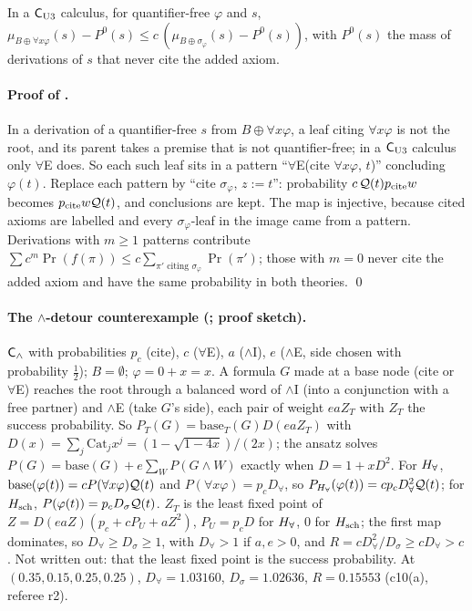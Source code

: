 \begin{proposition}\label{prop:univ:sim}
In a $\mathsf{C}_{\mathrm{U3}}$ calculus, for quantifier-free $\varphi$ and $s$, $\mu_{B\oplus\forall x\varphi}(s)-P^0(s)\le c\,(\mu_{B\oplus\sigma_\varphi}(s)-P^0(s))$, with $P^0(s)$ the mass of derivations of $s$ that never cite the added axiom.
\end{proposition}

\paragraph{Proof of .} In a derivation of a quantifier-free $s$ from $B\oplus\forall x\varphi$, a leaf citing $\forall x\varphi$ is not the root, and its parent takes a premise that is not quantifier-free; in a $\mathsf{C}_{\mathrm{U3}}$ calculus only $\forall$E does. So each such leaf sits in a pattern ``$\forall$E(cite $\forall x\varphi$, $t$)'' concluding $\varphi(t)$. Replace each pattern by ``cite $\sigma_\varphi$, $z:=t$'': probability $c\,\mathcal{Q}(t)p_{\mathrm{cite}}w$ becomes $p_{\mathrm{cite}}w\mathcal{Q}(t)$, and conclusions are kept. The map is injective, because cited axioms are labelled and every $\sigma_\varphi$-leaf in the image came from a pattern. Derivations with $m\ge1$ patterns contribute $\sum c^m\Pr(f(\pi))\le c\sum_{\pi'\text{ citing }\sigma_\varphi}\Pr(\pi')$; those with $m=0$ never cite the added axiom and have the same probability in both theories. \qed

\paragraph{The $\wedge$-detour counterexample (; proof sketch).}\label{app:univ:detour} $\mathsf{C}_{\wedge}$ with probabilities $p_c$ (cite), $c$ ($\forall$E), $a$ ($\wedge$I), $e$ ($\wedge$E, side chosen with probability $\tfrac12$); $B=\emptyset$; $\varphi=0+x=x$. A formula $G$ made at a base node (cite or $\forall$E) reaches the root through a balanced word of $\wedge$I (into a conjunction with a free partner) and $\wedge$E (take $G$'s side), each pair of weight $eaZ_T$ with $Z_T$ the success probability. So $P_T(G)=\mathrm{base}_T(G)D(eaZ_T)$ with $D(x)=\sum_j\mathrm{Cat}_jx^j=(1-\sqrt{1-4x})/(2x)$; the ansatz solves $P(G)=\mathrm{base}(G)+e\sum_WP(G\wedge W)$ exactly when $D=1+xD^2$. For $H_{\forall}$, $\mathrm{base}(\varphi(t))=cP(\forall x\varphi)\mathcal{Q}(t)$ and $P(\forall x\varphi)=p_cD_\forall$, so $P_{H_{\forall}}(\varphi(t))=cp_cD_\forall^2\mathcal{Q}(t)$; for $H_{\mathrm{sch}}$, $P(\varphi(t))=p_cD_\sigma\mathcal{Q}(t)$. $Z_T$ is the least fixed point of $Z=D(eaZ)(p_c+cP_U+aZ^2)$, $P_U=p_cD$ for $H_{\forall}$, $0$ for $H_{\mathrm{sch}}$; the first map dominates, so $D_\forall\ge D_\sigma\ge1$, with $D_\forall>1$ if $a,e>0$, and $R=cD_\forall^2/D_\sigma\ge cD_\forall>c$. Not written out: that the least fixed point is the success probability. At $(0.35,0.15,0.25,0.25)$, $D_\forall=1.03160$, $D_\sigma=1.02636$, $R=0.15553$ (c10(a), referee r2).


